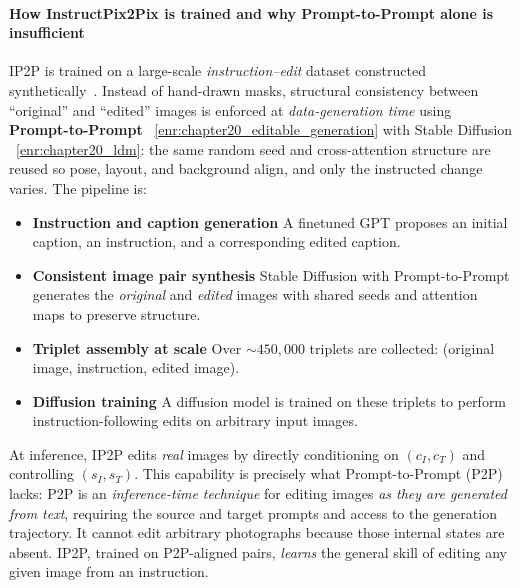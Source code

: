 \begin{enrichment}
\begin{enrichment}
        \paragraph{How InstructPix2Pix is trained and why Prompt-to-Prompt alone is insufficient}
        IP2P is trained on a large-scale \emph{instruction–edit} dataset constructed synthetically~\cite{brooks2023_instructpix2pix}. Instead of hand-drawn masks, structural consistency between ``original'' and ``edited'' images is enforced at \emph{data-generation time} using \textbf{Prompt-to-Prompt} ~\ref{enr:chapter20_editable_generation} with Stable Diffusion ~\ref{enr:chapter20_ldm}: the same random seed and cross-attention structure are reused so pose, layout, and background align, and only the instructed change varies. The pipeline is:
        \begin{itemize}
            \item \textbf{Instruction and caption generation} \; A finetuned GPT proposes an initial caption, an instruction, and a corresponding edited caption.
            \item \textbf{Consistent image pair synthesis} \; Stable Diffusion with Prompt-to-Prompt generates the \emph{original} and \emph{edited} images with shared seeds and attention maps to preserve structure.
            \item \textbf{Triplet assembly at scale} \; Over \(\sim\!450{,}000\) triplets are collected: (original image, instruction, edited image).
            \item \textbf{Diffusion training} \; A diffusion model is trained on these triplets to perform instruction-following edits on arbitrary input images.
        \end{itemize}
        At inference, IP2P edits \emph{real} images by directly conditioning on \((c_I,c_T)\) and controlling \((s_I,s_T)\). This capability is precisely what Prompt-to-Prompt (P2P) lacks: P2P is an \emph{inference-time technique} for editing images \emph{as they are generated from text}, requiring the source and target prompts and access to the generation trajectory. It cannot edit arbitrary photographs because those internal states are absent. IP2P, trained on P2P-aligned pairs, \emph{learns} the general skill of editing any given image from an instruction.
        

\end{enrichment}
\end{enrichment}

